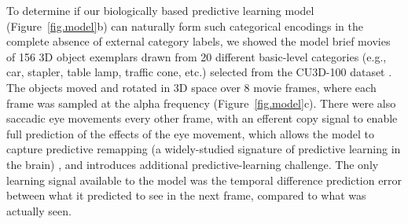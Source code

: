 \documentclass[12pt,twoside]{article}
\newif\myifpdf
\begin{document}

To determine if our biologically based predictive learning model (Figure~\ref{fig.model}b) can naturally form such categorical encodings in the complete absence of external category labels, we showed the model brief movies of 156 3D object exemplars drawn from 20 different basic-level categories (e.g., car, stapler, table lamp, traffic cone, etc.) selected from the CU3D-100 dataset \cite{OReillyWyatteHerdEtAl13}.  The objects moved and rotated in 3D space over 8 movie frames, where each frame was sampled at the alpha frequency (Figure~\ref{fig.model}c).  There were also saccadic eye movements every other frame, with an efferent copy signal to enable full prediction of the effects of the eye movement, which allows the model to capture predictive remapping (a widely-studied signature of predictive learning in the brain) \cite{DuhamelColbyGoldberg92,CavanaghHuntAfrazEtAl10}, and introduces additional predictive-learning challenge.  The only learning signal available to the model was the temporal difference prediction error between what it predicted to see in the next frame, compared to what was actually seen.  
\end{document}
